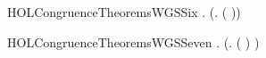 \newcommand{\HOLCongruenceTheoremsWGSFive}{\UseVerbatim{HOLCongruenceTheoremsWGSFive}}
\begin{SaveVerbatim}{HOLCongruenceTheoremsWGSSix}
\HOLTokenTurnstile{} \HOLSymConst{\HOLTokenForall{}} .   \HOLSymConst{\HOLTokenImp{}}  (\HOLTokenLambda{}. \HOLConst{\ensuremath{\nu}}  ( ))
\end{SaveVerbatim}
\newcommand{\HOLCongruenceTheoremsWGSSix}{\UseVerbatim{HOLCongruenceTheoremsWGSSix}}
\begin{SaveVerbatim}{HOLCongruenceTheoremsWGSSeven}
\HOLTokenTurnstile{} \HOLSymConst{\HOLTokenForall{}} .   \HOLSymConst{\HOLTokenImp{}}  (\HOLTokenLambda{}.  ( ) )
\end{SaveVerbatim}
\newcommand{\HOLCongruenceTheoremsWGSSeven}{\UseVerbatim{HOLCongruenceTheoremsWGSSeven}}

